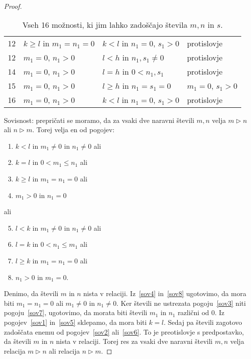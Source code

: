 \documentclass[../TG_magistrsko_delo_sections.tex]{subfiles}
\begin{document}
\begin{proof}
\begin{table}[h!]
\begin{tabular}{||c | l | l | l||}
 12 & $k \geq l$ in $m_1 = n_1 = 0$ & $k<l$ in $n_1 = 0$, $s_1 > 0$ & protislovje \\
 12 & $m_1 = 0$, $n_1 > 0$ & $l<h$ in $n_1, s_1 \neq 0$ & protislovje \\ 
 14 & $m_1 = 0$, $n_1 > 0$ & $l=h$ in $0<n_1, s_1$ & protislovje \\
 15 & $m_1 = 0$, $n_1 > 0$ & $l \geq h$ in $n_1 = s_1 = 0$ & $m_1 = 0$, $s_1 > 0$ \\
 16 & $m_1 = 0$, $n_1 > 0$ & $k<l$ in $n_1 = 0$, $s_1 > 0$ & protislovje \\[1ex] 
 \hline
\end{tabular}
\caption{Vseh 16 možnosti, ki jim lahko zadoščajo števila $m, n$ in $s$.}
\label{table:1}
\end{table}

Sovisnost: prepričati se moramo, da za vsaki dve naravni števili $m, n$ velja $m \triangleright n$ ali $n \triangleright m$. Torej velja en od pogojev:
\begin{enumerate}[label={(\roman*)}]
\item $k<l$ in $m_1 \neq 0$ in $n_1 \neq 0$ ali \label{sov1}
\item $k=l$ in $0<m_1 \leq n_1$ ali \label{sov2}
\item $k \geq l$ in $m_1 = n_1=0$ ali \label{sov3}
\item $m_1>0$ in $n_1 =0$ \label{sov4}
\end{enumerate}
ali 
\begin{enumerate}[label={(\roman*)}]
\setcounter{enumi}{4}
\item $l<k$ in $m_1 \neq 0$ in $n_1 \neq 0$ ali \label{sov5}
\item $l=k$ in $0<n_1 \leq m_1$ ali \label{sov6}
\item $l \geq k$ in $m_1 = n_1=0$ ali \label{sov7}
\item $n_1>0$ in $m_1 =0$. \label{sov8}
\end{enumerate}
Denimo, da števili $m$ in $n$ nista v relaciji. Iz~\ref{sov4} in~\ref{sov8} ugotovimo, da mora biti $m_1 = n_1 = 0$ ali $m_1 \neq 0$ in $n_1 \neq 0$. Ker števili ne ustrezata pogoju~\ref{sov3} niti pogoju~\ref{sov7}, ugotovimo, da morata biti števili $m_1$ in $n_1$ različni od 0. Iz pogojev~\ref{sov1} in~\ref{sov5} sklepamo, da mora biti $k=l$. Sedaj pa števili zagotovo zadoščata enemu od pogojev~\ref{sov2} ali~\ref{sov6}. To je preotislovje s predpostavko, da števili $m$ in $n$ nista v relaciji. Torej res za vsaki dve naravni števili $m, n$ velja relacija $m \triangleright n$ ali relacija $n \triangleright m$. 
\end{proof}
\end{document}
